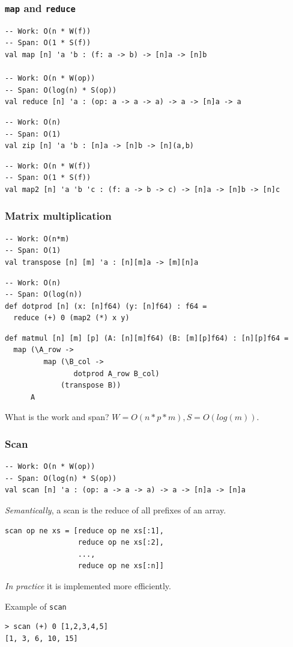 \begin{frame}[fragile]
  \frametitle{\texttt{map} and \texttt{reduce}}

\begin{lstlisting}
-- Work: O(n * W(f))
-- Span: O(1 * S(f))
val map [n] 'a 'b : (f: a -> b) -> [n]a -> [n]b

-- Work: O(n * W(op))
-- Span: O(log(n) * S(op))
val reduce [n] 'a : (op: a -> a -> a) -> a -> [n]a -> a
\end{lstlisting}
  \pause
\begin{lstlisting}
-- Work: O(n)
-- Span: O(1)
val zip [n] 'a 'b : [n]a -> [n]b -> [n](a,b)
\end{lstlisting}
  \pause
\begin{lstlisting}
-- Work: O(n * W(f))
-- Span: O(1 * S(f))
val map2 [n] 'a 'b 'c : (f: a -> b -> c) -> [n]a -> [n]b -> [n]c
\end{lstlisting}

\end{frame}

\begin{frame}[fragile]
  \frametitle{Matrix multiplication}

\begin{lstlisting}
-- Work: O(n*m)
-- Span: O(1)
val transpose [n] [m] 'a : [n][m]a -> [m][n]a
\end{lstlisting}

\pause

\begin{lstlisting}
-- Work: O(n)
-- Span: O(log(n))
def dotprod [n] (x: [n]f64) (y: [n]f64) : f64 =
  reduce (+) 0 (map2 (*) x y)
\end{lstlisting}
\pause
\begin{lstlisting}
def matmul [n] [m] [p] (A: [n][m]f64) (B: [m][p]f64) : [n][p]f64 =
  map (\A_row ->
         map (\B_col ->
                dotprod A_row B_col)
             (transpose B))
      A
\end{lstlisting}
What is the work and span?\pause
\hfill $W=O(n*p*m), S=O(log(m))$.
\end{frame}

\begin{frame}[fragile]
  \frametitle{Scan}
\begin{lstlisting}
-- Work: O(n * W(op))
-- Span: O(log(n) * S(op))
val scan [n] 'a : (op: a -> a -> a) -> a -> [n]a -> [n]a
\end{lstlisting}
  \emph{Semantically}, a scan is the reduce of all prefixes of an array.
\begin{lstlisting}
scan op ne xs = [reduce op ne xs[:1],
                 reduce op ne xs[:2],
                 ...,
                 reduce op ne xs[:n]]
\end{lstlisting}
  \emph{In practice} it is implemented more efficiently.

  \begin{block}{Example of \texttt{scan}}
\begin{lstlisting}
> scan (+) 0 [1,2,3,4,5]
[1, 3, 6, 10, 15]
\end{lstlisting}
  \end{block}
\end{frame}

